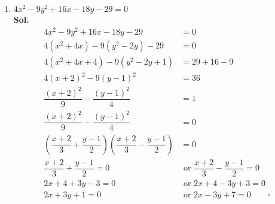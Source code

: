 \documentclass{report}
\newcommand{\sol}{\vspace{1em}\\\textbf{Sol.}}
\newcommand{\eos}{ \qquad \square}
\begin{document}
\begin{enumerate}[leftmargin=*]
\begin{enumerate}
              \item $4 x^2-9 y^2+16 x-18 y-29=0$
                    \sol{}
                    \begin{align*}
                        4x^2-9y^2+16x-18y-29                                                                     & =0                                              \\
                        4(x^2+4x)-9(y^2-2y)-29                                                                   & =0                                              \\
                        4(x^2+4x+4)-9(y^2-2y+1)                                                                  & =29+16-9                                        \\
                        4(x+2)^2-9(y-1)^2                                                                        & =36                                             \\
                        \dfrac{(x+2)^2}{9}-\dfrac{(y-1)^2}{4}                                                    & =1                                              \\
                        \dfrac{(x+2)^2}{9}-\dfrac{(y-1)^2}{4}                                                    & =0                                              \\
                        \left(\dfrac{x+2}{3} + \dfrac{y-1}{2}\right)\left(\dfrac{x+2}{3} - \dfrac{y-1}{2}\right) & =0                                              \\
                        \dfrac{x+2}{3} + \dfrac{y-1}{2} = 0                                                      & \text{ or } \dfrac{x+2}{3} - \dfrac{y-1}{2} = 0 \\
                        2x + 4 + 3y - 3 = 0                                                                      & \text{ or } 2x + 4 - 3y + 3 = 0                 \\
                        2x + 3y + 1 = 0                                                                          & \text{ or } 2x - 3y + 7 = 0 \eos
                    \end{align*}


\end{enumerate}
\end{enumerate}
\end{document}
